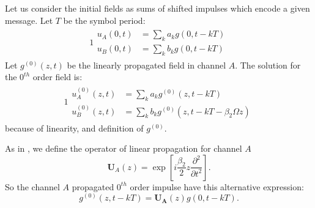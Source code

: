 \documentclass[10pt, lettersize, journal, onecolumn]{IEEEtran}
\begin{document}
Let us consider the initial fields as sums of shifted impulses which encode a given message. Let $T$ be the symbol period:
\begin{alignat}{1}
 \begin{aligned}
   u_A(0, t) &= \sum_{k}a_k g(0, t-kT)\\
   u_B(0, t) &= \sum_{k}b_k g(0, t-kT)
 \end{aligned}
\end{alignat}
%
Let $g^{(0)}(z, t)$ be the linearly propagated field in channel $A$.
The solution for the $0^{th}$ order field is:
\begin{alignat}{1}
 \begin{aligned}\label{eq:modulation}
   u_A^{(0)}(z, t) &= \sum_{k}a_k g^{(0)}(z, t-kT)\\
   u_B^{(0)}(z, t) &= \sum_{k}b_k g^{(0)}(z, t-kT - \beta_2 \Omega z)
 \end{aligned}
\end{alignat}
because of linearity, and definition of $g^{(0)}$.

As in \cite{Dar_2013}, we define the operator of linear propagation for channel $A$
\begin{equation}
	\mathbf{U}_A(z) = \exp\left[i \frac{\beta_2}{2} z \frac{\partial^2}{\partial t^2}\right].
\end{equation}
So the channel $A$ propagated $0^{th}$ order impulse have this alternative expression:
\begin{equation}
 g^{(0)}(z, t-kT) = \mathbf{U_A}(z) g(0, t-kT).
\end{equation}
\end{document}
